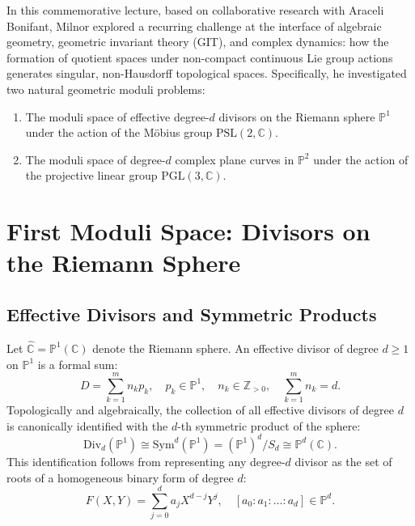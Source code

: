 \documentclass[11pt,a4paper]{article}
\begin{document}
In this commemorative lecture, based on collaborative research with Araceli Bonifant, Milnor explored a recurring challenge at the interface of algebraic geometry, geometric invariant theory (GIT), and complex dynamics: how the formation of quotient spaces under non-compact continuous Lie group actions generates singular, non-Hausdorff topological spaces. Specifically, he investigated two natural geometric moduli problems:
\begin{enumerate}
    \item The moduli space of effective degree-$d$ divisors on the Riemann sphere $\mathbb{P}^1$ under the action of the M\"obius group $\mathrm{PSL}(2, \mathbb{C})$.
    \item The moduli space of degree-$d$ complex plane curves in $\mathbb{P}^2$ under the action of the projective linear group $\mathrm{PGL}(3, \mathbb{C})$.
\end{enumerate}

\section{First Moduli Space: Divisors on the Riemann Sphere}

\subsection{Effective Divisors and Symmetric Products}
Let $\widehat{\mathbb{C}} = \mathbb{P}^1(\mathbb{C})$ denote the Riemann sphere. An effective divisor of degree $d \ge 1$ on $\mathbb{P}^1$ is a formal sum:
\begin{equation}
D = \sum_{k=1}^m n_k p_k, \quad p_k \in \mathbb{P}^1, \quad n_k \in \mathbb{Z}_{>0}, \quad \sum_{k=1}^m n_k = d.
\end{equation}
Topologically and algebraically, the collection of all effective divisors of degree $d$ is canonically identified with the $d$-th symmetric product of the sphere:
\begin{equation}
\mathrm{Div}_d(\mathbb{P}^1) \cong \mathrm{Sym}^d(\mathbb{P}^1) = (\mathbb{P}^1)^d / S_d \cong \mathbb{P}^d(\mathbb{C}).
\end{equation}
This identification follows from representing any degree-$d$ divisor as the set of roots of a homogeneous binary form of degree $d$:
\begin{equation}
F(X, Y) = \sum_{j=0}^d a_j X^{d-j} Y^j, \quad [a_0 : a_1 : \dots : a_d] \in \mathbb{P}^d.
\end{equation}
\end{document}

